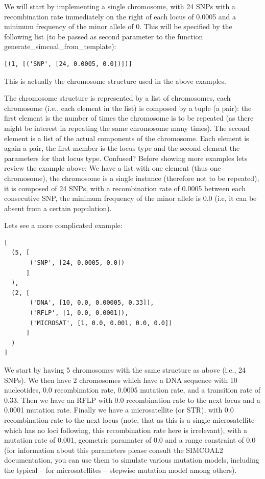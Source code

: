 \documentclass{report}
\begin{document}
We will start by implementing a single chromosome, with 24 SNPs with
a recombination rate immediately on the right of each locus of 0.0005 and a
minimum frequency of the minor allele of 0. This will be specified by the
following list (to be passed as second parameter to the function
generate\_simcoal\_from\_template):

\begin{verbatim}
[(1, [('SNP', [24, 0.0005, 0.0])])]
\end{verbatim}

This is actually the chromosome structure used in the above examples.


The chromosome structure is represented by a list of chromosomes,
each chromosome (i.e., each element in the list)
is composed by a tuple (a pair): the first element
is the number of times the chromosome is to be repeated (as there
might be interest in repeating the same chromosome many times).
The second element is a list of the actual components of the chromosome.
Each element is again a pair, the first member is the locus type and
the second element the parameters for that locus type. Confused?
Before showing more examples lets review the example above: We have
a list with one element (thus one chromosome), the chromosome is
a single instance (therefore not to be repeated), it is composed
of 24 SNPs, with a recombination rate of 0.0005 between each
consecutive SNP, the minimum frequency of the minor allele is
0.0 (i.e, it can be absent from a certain population).

Lets see a more complicated example:

\begin{verbatim}
[
  (5, [
       ('SNP', [24, 0.0005, 0.0])
      ]
  ),
  (2, [
       ('DNA', [10, 0.0, 0.00005, 0.33]),
       ('RFLP', [1, 0.0, 0.0001]),
       ('MICROSAT', [1, 0.0, 0.001, 0.0, 0.0])
      ]
  )
]
\end{verbatim}

We start by having 5 chromosomes with the same structure as
above (i.e., 24 SNPs). We then have 2 chromosomes which
have a DNA sequence with 10 nucleotides, 0.0 recombination rate,
0.0005 mutation rate, and a transition rate of 0.33. Then we
have an RFLP with 0.0 recombination rate to the next locus and
a 0.0001 mutation rate. Finally we have a microsatellite (or STR),
with 0.0 recombination rate to the next locus (note, that as this
is a single microsatellite which has no loci following, this
recombination rate here is irrelevant), with a mutation rate
of 0.001, geometric paramater of 0.0 and a range constraint
of 0.0 (for information about this parameters please consult
the SIMCOAL2 documentation, you can use them to simulate
various mutation models, including the typical  -- for microsatellites --
stepwise mutation model among others).
\end{document}
